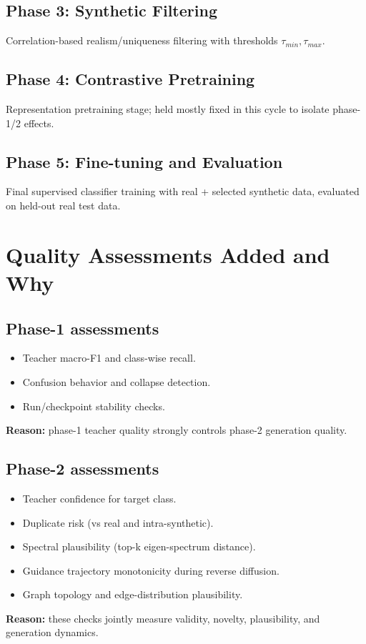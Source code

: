 \documentclass[11pt,a4paper]{article}
\begin{document}
\subsection{Phase 3: Synthetic Filtering}
Correlation-based realism/uniqueness filtering with thresholds $\tau_{min},\tau_{max}$.

\subsection{Phase 4: Contrastive Pretraining}
Representation pretraining stage; held mostly fixed in this cycle to isolate phase-1/2 effects.

\subsection{Phase 5: Fine-tuning and Evaluation}
Final supervised classifier training with real + selected synthetic data, evaluated on held-out real test data.

\section{Quality Assessments Added and Why}
\subsection{Phase-1 assessments}
\begin{itemize}[leftmargin=1.2em]
    \item Teacher macro-F1 and class-wise recall.
    \item Confusion behavior and collapse detection.
    \item Run/checkpoint stability checks.
\end{itemize}
\textbf{Reason:} phase-1 teacher quality strongly controls phase-2 generation quality.

\subsection{Phase-2 assessments}
\begin{itemize}[leftmargin=1.2em]
    \item Teacher confidence for target class.
    \item Duplicate risk (vs real and intra-synthetic).
    \item Spectral plausibility (top-k eigen-spectrum distance).
    \item Guidance trajectory monotonicity during reverse diffusion.
    \item Graph topology and edge-distribution plausibility.
\end{itemize}
\textbf{Reason:} these checks jointly measure validity, novelty, plausibility, and generation dynamics.
\end{document}
